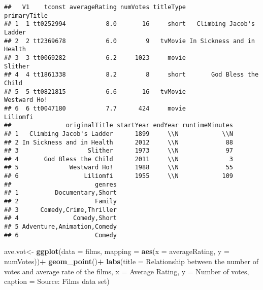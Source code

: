 \documentclass[
]{article}
\newenvironment{Shaded}{\begin{snugshade}}{\end{snugshade}}
\newcommand{\AttributeTok}[1]{\textcolor[rgb]{0.13,0.29,0.53}{#1}}
\newcommand{\FunctionTok}[1]{\textcolor[rgb]{0.13,0.29,0.53}{\textbf{#1}}}
\newcommand{\NormalTok}[1]{#1}
\newcommand{\OtherTok}[1]{\textcolor[rgb]{0.56,0.35,0.01}{#1}}
\newcommand{\SpecialCharTok}[1]{\textcolor[rgb]{0.81,0.36,0.00}{\textbf{#1}}}
\newcommand{\StringTok}[1]{\textcolor[rgb]{0.31,0.60,0.02}{#1}}
\begin{document}
\begin{verbatim}
##   V1    tconst averageRating numVotes titleType              primaryTitle
## 1  1 tt0252994           8.0       16     short   Climbing Jacob's Ladder
## 2  2 tt2369678           6.0        9   tvMovie In Sickness and in Health
## 3  3 tt0069282           6.2     1023     movie                   Slither
## 4  4 tt1861338           8.2        8     short       God Bless the Child
## 5  5 tt0821815           6.6       16   tvMovie              Westward Ho!
## 6  6 tt0047180           7.7      424     movie                  Liliomfi
##               originalTitle startYear endYear runtimeMinutes
## 1   Climbing Jacob's Ladder      1899     \\N            \\N
## 2 In Sickness and in Health      2012     \\N             88
## 3                   Slither      1973     \\N             97
## 4       God Bless the Child      2011     \\N              3
## 5              Westward Ho!      1988     \\N             55
## 6                  Liliomfi      1955     \\N            109
##                       genres
## 1          Documentary,Short
## 2                     Family
## 3      Comedy,Crime,Thriller
## 4               Comedy,Short
## 5 Adventure,Animation,Comedy
## 6                     Comedy
\end{verbatim}

\begin{Shaded}
\begin{Highlighting}[]
\NormalTok{ave.vot}\OtherTok{\textless{}{-}} \FunctionTok{ggplot}\NormalTok{(}\AttributeTok{data =}\NormalTok{ films, }\AttributeTok{mapping =} \FunctionTok{aes}\NormalTok{(}\AttributeTok{x =}\NormalTok{ averageRating, }\AttributeTok{y =}\NormalTok{ numVotes))}\SpecialCharTok{+}
  \FunctionTok{geom\_point}\NormalTok{()}\SpecialCharTok{+}
  \FunctionTok{labs}\NormalTok{(}\AttributeTok{title =} \StringTok{\textquotesingle{}Relationship between the number of votes and average rate of the films\textquotesingle{}}\NormalTok{,}
       \AttributeTok{x =} \StringTok{\textquotesingle{}Average Rating\textquotesingle{}}\NormalTok{,}
       \AttributeTok{y =} \StringTok{\textquotesingle{}Number of votes\textquotesingle{}}\NormalTok{,}
       \AttributeTok{caption =} \StringTok{\textquotesingle{}Source: Films data set\textquotesingle{}}\NormalTok{)}
\end{Highlighting}
\end{Shaded}
\end{document}
